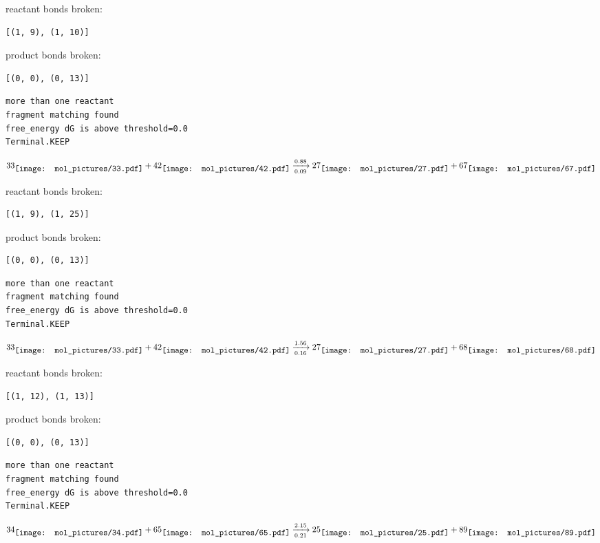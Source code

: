 \documentclass{article}
\begin{document}
reactant bonds broken:\begin{verbatim}
[(1, 9), (1, 10)]
\end{verbatim}
product bonds broken:\begin{verbatim}
[(0, 0), (0, 13)]
\end{verbatim}




\vspace{1cm}
\begin{verbatim}
more than one reactant
fragment matching found
free_energy dG is above threshold=0.0
Terminal.KEEP
\end{verbatim}
$$
33
\raisebox{-.5\height}{\texttt{[image: mol\_pictures/33.pdf]}}
+
42
\raisebox{-.5\height}{\texttt{[image: mol\_pictures/42.pdf]}}
\xrightarrow[0.09]{0.88}
27
\raisebox{-.5\height}{\texttt{[image: mol\_pictures/27.pdf]}}
+
67
\raisebox{-.5\height}{\texttt{[image: mol\_pictures/67.pdf]}}
$$


reactant bonds broken:\begin{verbatim}
[(1, 9), (1, 25)]
\end{verbatim}
product bonds broken:\begin{verbatim}
[(0, 0), (0, 13)]
\end{verbatim}




\vspace{1cm}
\begin{verbatim}
more than one reactant
fragment matching found
free_energy dG is above threshold=0.0
Terminal.KEEP
\end{verbatim}
$$
33
\raisebox{-.5\height}{\texttt{[image: mol\_pictures/33.pdf]}}
+
42
\raisebox{-.5\height}{\texttt{[image: mol\_pictures/42.pdf]}}
\xrightarrow[0.16]{1.56}
27
\raisebox{-.5\height}{\texttt{[image: mol\_pictures/27.pdf]}}
+
68
\raisebox{-.5\height}{\texttt{[image: mol\_pictures/68.pdf]}}
$$


reactant bonds broken:\begin{verbatim}
[(1, 12), (1, 13)]
\end{verbatim}
product bonds broken:\begin{verbatim}
[(0, 0), (0, 13)]
\end{verbatim}




\vspace{1cm}
\begin{verbatim}
more than one reactant
fragment matching found
free_energy dG is above threshold=0.0
Terminal.KEEP
\end{verbatim}
$$
34
\raisebox{-.5\height}{\texttt{[image: mol\_pictures/34.pdf]}}
+
65
\raisebox{-.5\height}{\texttt{[image: mol\_pictures/65.pdf]}}
\xrightarrow[0.21]{2.15}
25
\raisebox{-.5\height}{\texttt{[image: mol\_pictures/25.pdf]}}
+
89
\raisebox{-.5\height}{\texttt{[image: mol\_pictures/89.pdf]}}
$$
\end{document}
